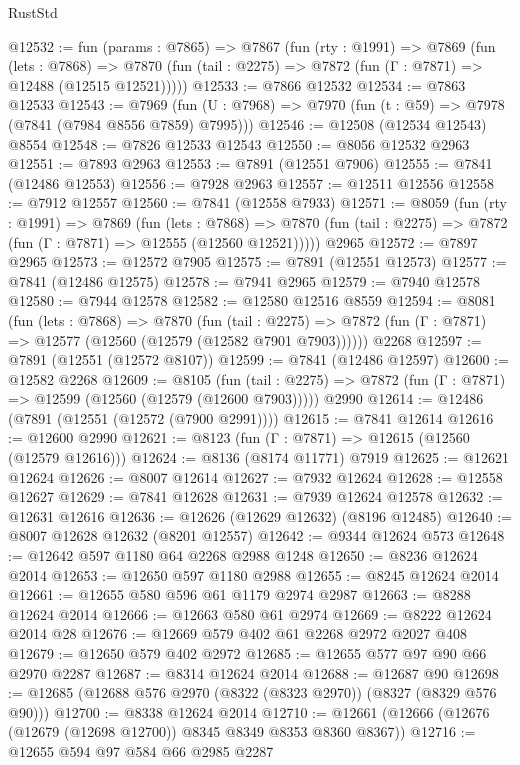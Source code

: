 \begin{lexlean}{RustStd}
\begin{coremodule}
@12532 := fun (params : @7865) =>
  @7867
    (fun (rty : @1991) =>
    @7869
      (fun (lets : @7868) =>
      @7870 (fun (tail : @2275) => @7872 (fun (Γ : @7871) => @12488 (@12515 @12521)))))
@12533 := @7866 @12532
@12534 := @7863 @12533
@12543 := @7969
    (fun (U : @7968) => @7970 (fun (t : @59) => @7978 (@7841 (@7984 @8556 @7859) @7995)))
@12546 := @12508 (@12534 @12543) @8554
@12548 := @7826 @12533 @12543
@12550 := @8056 @12532 @2963
@12551 := @7893 @2963
@12553 := @7891 (@12551 @7906)
@12555 := @7841 (@12486 @12553)
@12556 := @7928 @2963
@12557 := @12511 @12556
@12558 := @7912 @12557
@12560 := @7841 (@12558 @7933)
@12571 := @8059
    (fun (rty : @1991) =>
    @7869
      (fun (lets : @7868) =>
      @7870 (fun (tail : @2275) => @7872 (fun (Γ : @7871) => @12555 (@12560 @12521)))))
    @2965
@12572 := @7897 @2965
@12573 := @12572 @7905
@12575 := @7891 (@12551 @12573)
@12577 := @7841 (@12486 @12575)
@12578 := @7941 @2965
@12579 := @7940 @12578
@12580 := @7944 @12578
@12582 := @12580 @12516 @8559
@12594 := @8081
    (fun (lets : @7868) =>
    @7870
      (fun (tail : @2275) =>
      @7872 (fun (Γ : @7871) => @12577 (@12560 (@12579 (@12582 @7901 @7903))))))
    @2268
@12597 := @7891 (@12551 (@12572 @8107))
@12599 := @7841 (@12486 @12597)
@12600 := @12582 @2268
@12609 := @8105
    (fun (tail : @2275) => @7872 (fun (Γ : @7871) => @12599 (@12560 (@12579 (@12600 @7903)))))
    @2990
@12614 := @12486 (@7891 (@12551 (@12572 (@7900 @2991))))
@12615 := @7841 @12614
@12616 := @12600 @2990
@12621 := @8123 (fun (Γ : @7871) => @12615 (@12560 (@12579 @12616)))
@12624 := @8136 (@8174 @11771) @7919
@12625 := @12621 @12624
@12626 := @8007 @12614
@12627 := @7932 @12624
@12628 := @12558 @12627
@12629 := @7841 @12628
@12631 := @7939 @12624 @12578
@12632 := @12631 @12616
@12636 := @12626 (@12629 @12632) (@8196 @12485)
@12640 := @8007 @12628 @12632 (@8201 @12557)
@12642 := @9344 @12624 @573
@12648 := @12642 @597 @1180 @64 @2268 @2988 @1248
@12650 := @8236 @12624 @2014
@12653 := @12650 @597 @1180 @2988
@12655 := @8245 @12624 @2014
@12661 := @12655 @580 @596 @61 @1179 @2974 @2987
@12663 := @8288 @12624 @2014
@12666 := @12663 @580 @61 @2974
@12669 := @8222 @12624 @2014 @28
@12676 := @12669 @579 @402 @61 @2268 @2972 @2027 @408
@12679 := @12650 @579 @402 @2972
@12685 := @12655 @577 @97 @90 @66 @2970 @2287
@12687 := @8314 @12624 @2014
@12688 := @12687 @90
@12698 := @12685 (@12688 @576 @2970 (@8322 (@8323 @2970)) (@8327 (@8329 @576 @90)))
@12700 := @8338 @12624 @2014
@12710 := @12661 (@12666 (@12676 (@12679 (@12698 @12700)) @8345 @8349 @8353 @8360 @8367))
@12716 := @12655 @594 @97 @584 @66 @2985 @2287

\end{coremodule}
\end{lexlean}
